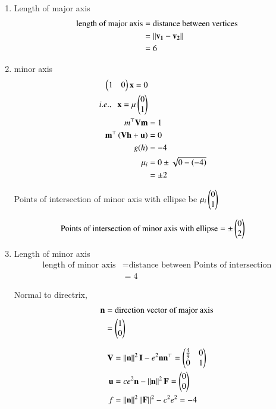 \documentclass[journal,12pt,twocolumn]{IEEEtran}
\begin{document}
\begin{enumerate}
\item Length of major axis
\begin{align}
	\text{length of major axis}	&= \text{distance between vertices}\\
					&= \left\lVert \mathbf{v_1} - \mathbf{v_2}\right\rVert\\
					&=6
\end{align}

\item minor axis
	\begin{align}
	\begin{pmatrix}1&0\end{pmatrix} \mathbf{x} = 0\\
	i.e., \;\; \mathbf{x} = \mu \begin{pmatrix}0\\1\end{pmatrix}\\	
	m^{\top}\mathbf{V}\mathbf{m} &= 1\\
	\mathbf{m}^{\top}\left(\mathbf{V}\mathbf{h}+\mathbf{u}\right) &= 0\\
	g(h) &= -4\\
	{\mu}_i &= 0 \pm \sqrt{0 - \left(-4\right)}\\
		&= \pm 2
	\end{align}

Points of intersection of minor axis with ellipse be $\mu_i \begin{pmatrix}0\\1\end{pmatrix}$

\begin{align}
	\text{Points of intersection of minor axis with ellipse} &= \pm \begin{pmatrix}0\\2\end{pmatrix}
\end{align}

\item Length of minor axis
\begin{align}
	\text{length of minor axis} &= \text{distance between Points of intersection}\\
				    &= 4
\end{align}

Normal to directrix,
\begin{align}
	\mathbf{n} &= \text{direction vector of major axis}\\
		&= \begin{pmatrix}1\\0\end{pmatrix}
\end{align}

\begin{align}
	\mathbf{V} &= \left\lVert\mathbf{n}\right\rVert^2 \mathbf{I} - e^2 \mathbf{n} \mathbf{n}^{\top} = \begin{pmatrix}\frac{4}{9}&0\\0&1\end{pmatrix}	\label{eq:1} \\
	\mathbf{u} &= ce^2 \mathbf{n} - \left\lVert\mathbf{n}\right\rVert^2\mathbf{F} = \begin{pmatrix}0\\0\end{pmatrix}	\label{eq:2}\\
	f &= \left\lVert\mathbf{n}\right\rVert^2 \left\lVert\mathbf{F}\right\rVert^2 - c^2e^2  = -4 \label{eq:3}
\end{align}


\end{enumerate}
\end{document}
